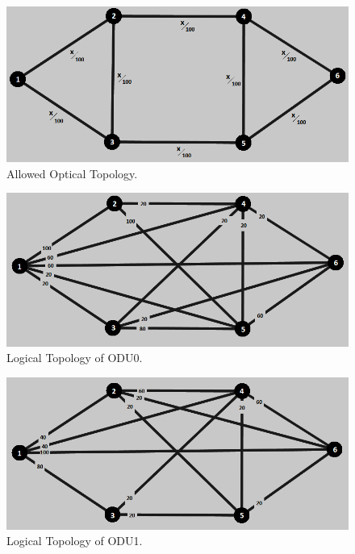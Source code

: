 \begin{figure}[H]
\centering
\includegraphics[width=13cm]{sdf/heuristic/figures/topologies/opaque_protec/high/allowed_optical_high}
\caption{Allowed Optical Topology.}
\label{allowed_optical_protec_ref_high_heuristic}
\end{figure}

\begin{figure}[H]
\centering
\includegraphics[width=13cm]{sdf/heuristic/figures/topologies/opaque_protec/high/logical_topology_odu0_high}
\caption{Logical Topology of ODU0.}
\label{logical_ODU0_protec_ref_high_heuristic}
\end{figure}

\begin{figure}[H]
\centering
\includegraphics[width=13cm]{sdf/heuristic/figures/topologies/opaque_protec/high/logical_topology_odu1_high}
\caption{Logical Topology of ODU1.}
\label{logical_ODU1_protec_ref_high_heuristic}
\end{figure}

